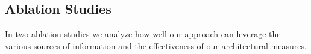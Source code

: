 \documentclass[letterpaper, 10 pt, journal, twoside]{IEEEtran}
\begin{document}
\subsection{Ablation Studies}
In two ablation studies we analyze how well our approach can leverage the various sources of information and the effectiveness of our architectural measures.

\begin{table}[!t]
	\scriptsize
	\caption{Context ablation study on the test set}
	\vspace{-0.1cm}
	\label{tab:results_ablation_context}
	\setlength{\tabcolsep}{2.3pt}
	\centering
	\vspace{-0.1cm}
\end{table} \begin{table}[!t]

\end{table}
\end{document}
